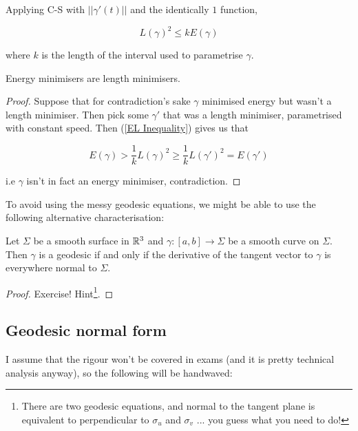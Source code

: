 \documentclass[11pt]{scrartcl}
\begin{document}
Applying C-S with $||\gamma'(t)||$ and the identically $1$ function,

\begin{equation}
    L(\gamma)^2 \le k E(\gamma)
\label{EL Inequality}
\end{equation}

where $k$ is the length of the interval used to parametrise $\gamma$. 
\begin{proposition}
Energy minimisers are length minimisers.

\begin{proof}
Suppose that for contradiction's sake $\gamma$ minimised energy but wasn't a length minimiser. Then pick some $\gamma'$ that was a length minimiser, parametrised with constant speed. Then (\ref{EL Inequality}) gives us that

\begin{equation}
    E(\gamma) > \frac1k L(\gamma)^2 \ge \frac1k L(\gamma')^2 = E(\gamma')
\end{equation}

i.e $\gamma$ isn't in fact an energy minimiser, contradiction.
\end{proof}
\end{proposition}

To avoid using the messy geodesic equations, we might be able to use the following alternative characterisation:

\begin{proposition}
Let $\Sigma$ be a smooth surface in $\mathbb R^3$ and $\gamma : [a, b] \rightarrow \Sigma$ be a smooth curve on $\Sigma$. Then $\gamma$ is a geodesic if and only if the derivative of the tangent vector to $\gamma$ is everywhere normal to $\Sigma$.

\begin{proof}
Exercise! Hint\footnote{There are two geodesic equations, and normal to the tangent plane is equivalent to perpendicular to $\sigma_u$ and $\sigma_v$ ... you guess what you need to do!}.
\end{proof}
\end{proposition}

\subsection{Geodesic normal form}

I assume that the rigour won't be covered in exams (and it is pretty technical analysis anyway), so the following will be handwaved:
\end{document}
